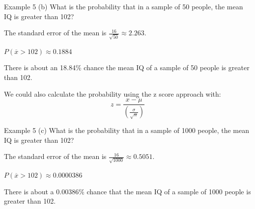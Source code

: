 \documentclass[t]{beamer}
\begin{document}
\begin{frame}{Example 5}
(b)	\quad	What is the probability that in a sample of 50 people, the mean IQ is greater than 102?	\newline\\	\pause

The standard error of the mean is $\frac{16}{\sqrt{50}} \approx 2.263$.	\newline\\	\pause

$P(\overline{x} > 102) \approx 0.1884$	\newline\\	\pause

There is about an 18.84\% chance the mean IQ of a sample of 50 people is greater than 102.	\newline\\	\pause

We could also calculate the probability using the z score approach with:
\[z = \frac{x-\mu}{\left(\frac{\sigma}{\sqrt{n}}\right)}\]
\end{frame}

\begin{frame}{Example 5}
(c)	\quad What is the probability that in a sample of 1000 people, the mean IQ is greater than 102?	\newline\\	\pause

The standard error of the mean is $\frac{16}{\sqrt{1000}} \approx 0.5051$.	\newline\\	\pause

$P(\overline{x} > 102) \approx 0.0000386$	\newline\\	\pause

There is about a 0.00386\% chance that the mean IQ of a sample of 1000 people is greater than 102.
\end{frame}
\end{document}
